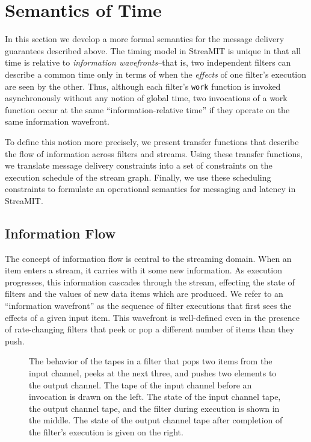 \section{Semantics of Time}
\label{sec:time}
In this section we develop a more formal semantics for the message
delivery guarantees described above.  The timing model in StreaMIT is
unique in that all time is relative to {\it information
wavefronts}--that is, two independent filters can describe a common
time only in terms of when the {\it effects} of one filter's execution
are seen by the other.  Thus, although each filter's {\tt work}
function is invoked asynchronously without any notion of global time,
two invocations of a work function occur at the same
``information-relative time'' if they operate on the same information
wavefront.

To define this notion more precisely, we present transfer functions
that describe the flow of information across filters and streams.
Using these transfer functions, we translate message delivery
constraints into a set of constraints on the execution schedule of the
stream graph.  Finally, we use these scheduling constraints to
formulate an operational semantics for messaging and latency in
StreaMIT.

\subsection{Information Flow}

The concept of information flow is central to the streaming domain.
When an item enters a stream, it carries with it some new information.
As execution progresses, this information cascades through the stream,
effecting the state of filters and the values of new data items which
are produced.  We refer to an ``information wavefront'' as the
sequence of filter executions that first sees the effects of a given
input item.  This wavefront is well-defined even in the presence of
rate-changing filters that peek or pop a different number of items
than they push.

\begin{figure}
\centering
{}
\caption{The behavior of the tapes in a filter that pops two items
from the input channel, peeks at the next three, and pushes two
elements to the output channel. The tape of the input channel before
an invocation is drawn on the left. The state of the input channel
tape, the output channel tape, and the filter during execution is
shown in the middle. The state of the output channel tape after
completion of the filter's execution is given on the right.}
\label{fig:tapes}
\end{figure}

